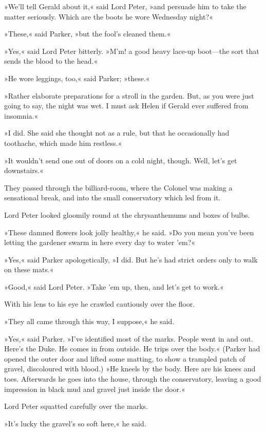 »We'll tell Gerald about it,« said Lord Peter, »and persuade him to take the matter seriously. Which are the boots he wore Wednesday night?«

»These,« said Parker, »but the fool's cleaned them.«

»Yes,« said Lord Peter bitterly. »M'm! a good heavy lace-up boot\allowbreak---\allowbreak the sort that sends the blood to the head.«

»He wore leggings, too,« said Parker; »these.«

»Rather elaborate preparations for a stroll in the garden. But, as you were just going to say, the night was wet. I must ask Helen if Gerald ever suffered from insomnia.«

»I did. She said she thought not as a rule, but that he occasionally had toothache, which made him restless.«

»It wouldn't send one out of doors on a cold night, though. Well, let's get downstairs.«

They passed through the billiard-room, where the Colonel was making a sensational break, and into the small conservatory which led from it.

Lord Peter looked gloomily round at the chrysanthemums and boxes of bulbs.

»These damned flowers look jolly healthy,« he said. »Do you mean you've been letting the gardener swarm in here every day to water 'em?«

»Yes,« said Parker apologetically, »I did. But he's had strict orders only to walk on these mats.«

»Good,« said Lord Peter. »Take 'em up, then, and let's get to work.«

With his lens to his eye he crawled cautiously over the floor.

»They all came through this way, I suppose,« he said.

»Yes,« said Parker. »I've identified most of the marks. People went in and out. Here's the Duke. He comes in from outside. He trips over the body.« (Parker had opened the outer door and lifted some matting, to show a trampled patch of gravel, discoloured with blood.) »He kneels by the body. Here are his knees and toes. Afterwards he goes into the house, through the conservatory, leaving a good impression in black mud and gravel just inside the door.«

Lord Peter squatted carefully over the marks.

»It's lucky the gravel's so soft here,« he said.

